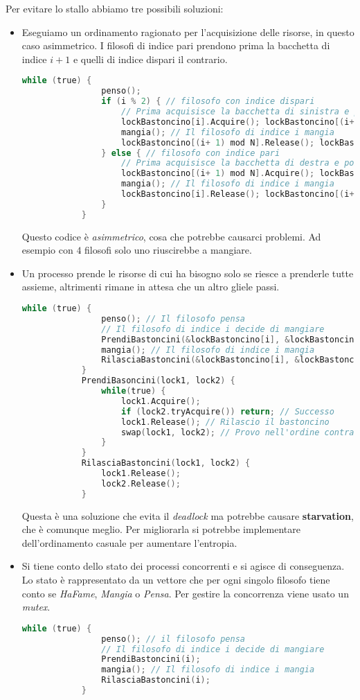 \begin{example}
	Per evitare lo stallo abbiamo tre possibili soluzioni:
	\begin{itemize}
		\item Eseguiamo un ordinamento ragionato per l'acquisizione delle risorse, in questo caso asimmetrico. I filosofi di indice pari prendono prima la bacchetta di indice $i+1$ e quelli di indice dispari il contrario.
		\begin{lstlisting}[language=C]
			while (true) {
				penso(); 
				if (i % 2) { // filosofo con indice dispari
					// Prima acquisisce la bacchetta di sinistra e poi quella di destra 
					lockBastoncino[i].Acquire(); lockBastoncino[(i+ 1) mod N].Acquire();
					mangia(); // Il filosofo di indice i mangia 
					lockBastoncino[(i+ 1) mod N].Release(); lockBastoncino[i].Release(); 
				} else { // filosofo con indice pari
					// Prima acquisisce la bacchetta di destra e poi quella di sinistra
					lockBastoncino[(i+ 1) mod N].Acquire(); lockBastoncino[i].Acquire();
					mangia(); // Il filosofo di indice i mangia 
					lockBastoncino[i].Release(); lockBastoncino[(i+ 1) mod N].Release(); 
				}
			}
		\end{lstlisting}
		Questo codice è \textit{asimmetrico}, cosa che potrebbe causarci problemi. Ad esempio con $4$ filosofi solo uno riuscirebbe a mangiare.
		\item Un processo prende le risorse di cui ha bisogno solo se riesce a prenderle tutte assieme, altrimenti rimane in attesa che un altro gliele passi. \begin{lstlisting}[language=C]
			while (true) {
				penso(); // Il filosofo pensa
				// Il filosofo di indice i decide di mangiare 
				PrendiBastoncini(&lockBastoncino[i], &lockBastoncino[[(i+ 1) mod N); 
				mangia(); // Il filosofo di indice i mangia 
				RilasciaBastoncini(&lockBastoncino[i], &lockBastoncino[[(i+ 1) mod N); 
			}
			PrendiBasoncini(lock1, lock2) { 
				while(true) { 
					lock1.Acquire(); 
					if (lock2.tryAcquire()) return; // Successo
					lock1.Release(); // Rilascio il bastoncino
					swap(lock1, lock2); // Provo nell'ordine contrario
				}
			} 
			RilasciaBastoncini(lock1, lock2) {
				lock1.Release();
				lock2.Release(); 
			}
		\end{lstlisting}
		Questa è una soluzione che evita il \textit{deadlock} ma potrebbe causare \textbf{starvation}, che è comunque meglio. Per migliorarla si potrebbe implementare dell'ordinamento casuale per aumentare l'entropia.
		\item Si tiene conto dello stato dei processi concorrenti e si agisce di conseguenza. Lo stato è rappresentato da un vettore che per ogni singolo filosofo tiene conto se \textit{HaFame}, \textit{Mangia} o \textit{Pensa}. Per gestire la concorrenza viene usato un \textit{mutex}.
		\begin{lstlisting}[language=C]
			while (true) {
				penso(); // il filosofo pensa
				// Il filosofo di indice i decide di mangiare 
				PrendiBastoncini(i); 
				mangia(); // Il filosofo di indice i mangia 
				RilasciaBastoncini(i); 
			}
			

\end{lstlisting}
\end{itemize}
\end{example}
